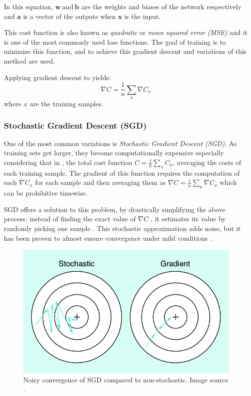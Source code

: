 In this equation, $\bm{w}~\text{and}~\bm{b}$ are the weights and biases
of the network respectively and $\bm{a}$ is a vector of the outputs when
$\bm{x}$ is the input.

This cost function is also known as \textit{quadratic} or \textit{mean
  squared error (MSE)} and it is one of the most commonly used loss
functions. 
The goal of training is to minimize this function, and to achieve this
gradient descent and variations of this method are used.

Applying gradient descent to  yields:
\begin{equation}
  \label{eq:cost_func_grad}
  \nabla C = \frac{1}{n} \sum_x\nabla C_x
\end{equation}
where $x$ are the training samples.

\subsubsection*{Stochastic Gradient Descent (SGD)}
One of the most common variations is \textit{Stochastic Gradient
Descent (SGD)}. As training sets get larger, they become
computationally expensive especially considering that in
, the total cost function $C =
\frac{1}{n}\sum_x C_x$, averaging the costs of each training sample.
The gradient of this function requires the computation of each $\nabla
C_x$ for each sample and then averaging them as $\nabla C =
\frac{1}{n}\sum_x\nabla C_x$ which can be prohibitive timewise.

SGD offers a solution to this problem, by drastically simplifying
the above process; instead of finding the exact value of $\nabla C$
, it estimates its value by randomly picking one sample \cite{article:bottou}.
This stochastic approximation adds noise, but it has been proven to
almost ensure convergence under mild conditions \cite{book:robbins}.

\begin{figure}[!h]
  \centering
  \includegraphics[width=.8\textwidth]{Figures/chap_nn/gradient_stoch.png}
  \caption{Noisy convergence of SGD compared to non-stochastic. Image
source \cite{article:image_gradient}.}
  \label{fig:gradient_descent_noisy}
\end{figure}


